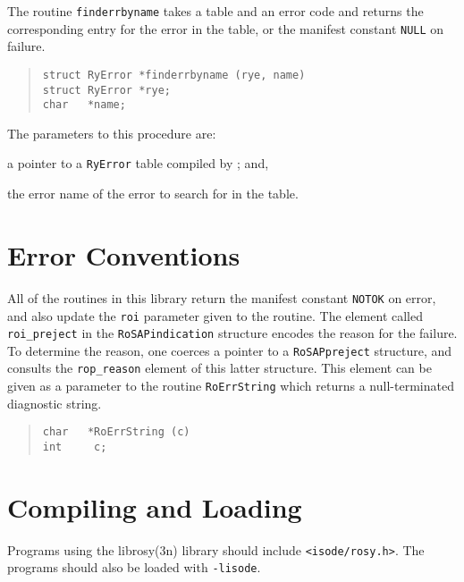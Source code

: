 The routine \verb"finderrbyname" takes a table and an error code and returns
the corresponding entry for the error in the table,
or the manifest constant \verb"NULL" on failure.
\begin{quote}\small\begin{verbatim}
struct RyError *finderrbyname (rye, name)
struct RyError *rye;
char   *name;
\end{verbatim}\end{quote}
The parameters to this procedure are:
\begin{describe}
\item[\verb"rye":] a pointer to a \verb"RyError" table compiled by
;
and,

\item[\verb"name":] the error name of the error to search for in the
table.
\end{describe}

\section	{Error Conventions}
All of the routines in this library return the manifest constant \verb"NOTOK"
on error,
and also update the \verb"roi" parameter given to the routine.
The element called \verb"roi_preject" in the \verb"RoSAPindication" structure
encodes the reason for the failure.
To determine the reason,
one coerces a pointer to a \verb"RoSAPpreject" structure,
and consults the \verb"rop_reason" element of this latter structure.
This element can be given as a
parameter to the routine \verb"RoErrString" which returns a null-terminated
diagnostic string.
\begin{quote}\small\begin{verbatim}
char   *RoErrString (c)
int     c;
\end{verbatim}\end{quote}

\section	{Compiling and Loading}
Programs using the \man librosy(3n) library should include
\verb"<isode/rosy.h>".
The programs should also be loaded with \verb"-lisode".


